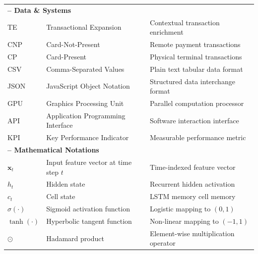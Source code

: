 \begin{longtable}{@{}p{2cm} p{5.5cm} p{5cm}@{}}
\multicolumn{3}{l}{\textbf{– Data \& Systems}}\\
TE       & Transactional Expansion                  & Contextual transaction enrichment \\
CNP      & Card-Not-Present                         & Remote payment transactions \\
CP       & Card-Present                             & Physical terminal transactions \\
CSV      & Comma-Separated Values                   & Plain text tabular data format \\
JSON     & JavaScript Object Notation               & Structured data interchange format \\
GPU      & Graphics Processing Unit                 & Parallel computation processor \\
API      & Application Programming Interface        & Software interaction interface \\
KPI      & Key Performance Indicator                & Measurable performance metric \\[3pt]

\multicolumn{3}{l}{\textbf{– Mathematical Notations}}\\
$\mathbf{x}_t$ & Input feature vector at time step $t$  & Time-indexed feature vector \\
$h_t$          & Hidden state                             & Recurrent hidden activation \\
$c_t$          & Cell state                               & LSTM memory cell memory \\
$\sigma(\cdot)$ & Sigmoid activation function             & Logistic mapping to $(0, 1)$ \\
$\tanh(\cdot)$  & Hyperbolic tangent function              & Non-linear mapping to $(-1, 1)$ \\
$\odot$         & Hadamard product                         & Element-wise multiplication operator \\
\end{longtable}
\endgroup

\restoregeometry
\cleardoublepage
